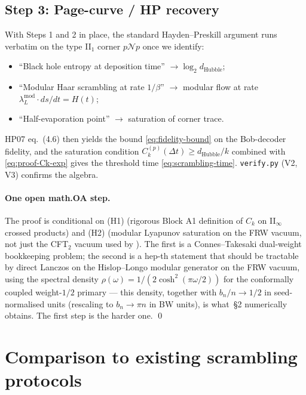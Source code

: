 \documentclass[11pt]{article}
\theoremstyle{definition}
\theoremstyle{remark}
\newcommand{\N}{\mathcal{N}}
\begin{document}
\subsection{Step 3: Page-curve / HP recovery}

With Steps 1 and 2 in place, the standard Hayden--Preskill argument
\cite[\S 4]{HaydenPreskill07} runs verbatim on the type II$_1$ corner
$p\N p$ once we identify:
\begin{itemize}
  \item ``Black hole entropy at deposition time'' $\to\log_2 d_{\mathrm{Hubble}}$;
  \item ``Modular Haar scrambling at rate $1/\beta$'' $\to$ modular flow
        at rate $\lambda_L^{\mathrm{mod}}\cdot ds/dt = H(t)$;
  \item ``Half-evaporation point'' $\to$ saturation of corner trace.
\end{itemize}
HP07 eq.~(4.6) then yields the bound \eqref{eq:fidelity-bound} on the
Bob-decoder fidelity, and the saturation condition $C_k^{(p)}(\Delta t)\ge
d_{\mathrm{Hubble}}/k$ combined with \eqref{eq:proof-Ck-exp} gives the
threshold time \eqref{eq:scrambling-time}. \texttt{verify.py} (V2, V3)
confirms the algebra.

\paragraph{One open math.OA step.} The proof is conditional on (H1)
(rigorous Block A1 definition of $C_k$ on II$_\infty$ crossed products)
and (H2) (modular Lyapunov saturation on the FRW vacuum, not just the
CFT$_2$ vacuum used by \cite{CMPT24}). The first is a Connes--Takesaki
dual-weight bookkeeping problem; the second is a hep-th statement that
should be tractable by direct Lanczos on the Hislop--Longo modular
generator on the FRW vacuum, using the spectral density
$\rho(\omega)=1/(2\cosh^2(\pi\omega/2))$ for the conformally coupled
weight-$1/2$ primary --- this density, together with $b_n/n\to 1/2$ in
seed-normalised units (rescaling to $b_n\to\pi n$ in BW units), is what
\cite{piste1note}\,\S2 numerically obtains. The first step is the harder
one. \qed

\section{Comparison to existing scrambling protocols}
\label{sec:compare}
\end{document}
